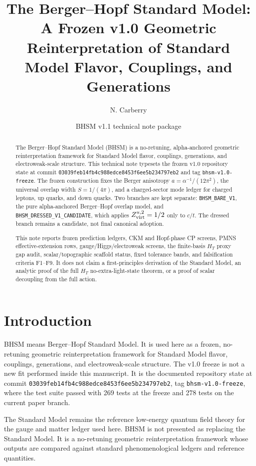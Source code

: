 \documentclass[11pt]{article}
\title{The Berger--Hopf Standard Model: A Frozen v1.0 Geometric Reinterpretation of Standard Model Flavor, Couplings, and Generations}
\author{N. Carberry}
\date{BHSM v1.1 technical note package}
\newcommand{\BHSM}{BHSM}
\newcommand{\Bare}{\texttt{BHSM\_BARE\_V1}}
\newcommand{\Dressed}{\texttt{BHSM\_DRESSED\_V1}\allowbreak\texttt{\_CANDIDATE}}
\newcommand{\HT}{\ensuremath{H_T}}
\newcommand{\CommitHash}{\texttt{03039feb14fb4c988edce}\allowbreak\texttt{8453f6ee5b234797eb2}}
\begin{document}
\maketitle

\begin{abstract}
The Berger--Hopf Standard Model (\BHSM) is a no-retuning, alpha-anchored
geometric reinterpretation framework for Standard Model flavor, couplings,
generations, and electroweak-scale structure. This technical note typesets the
frozen v1.0 repository state at commit
\CommitHash{} and tag
\texttt{bhsm-v1.0-freeze}. The frozen construction fixes the Berger anisotropy
$a=\alpha^{-1}/(12\pi^2)$, the universal overlap width $S=1/(4\pi)$, and a
charged-sector mode ledger for charged leptons, up quarks, and down quarks.
Two branches are kept separate: \Bare, the pure alpha-anchored Berger--Hopf
overlap model, and \Dressed, which applies $Z_{\rm virt}^{u,2}=1/2$ only to
$c/t$. The dressed branch remains a candidate, not final canonical adoption.

This note reports frozen prediction ledgers, CKM and Hopf-phase CP screens,
PMNS effective-extension rows, gauge/Higgs/electroweak screens, the finite-basis
\HT{} proxy gap audit, scalar/topographic scaffold status, fixed tolerance
bands, and falsification criteria F1--F9. It does not claim a first-principles
derivation of the Standard Model, an analytic proof of the full \HT{}
no-extra-light-state theorem, or a proof of scalar decoupling from the full
action.
\end{abstract}

\section{Introduction}

\BHSM{} means Berger--Hopf Standard Model. It is used here as a frozen,
no-retuning geometric reinterpretation framework for Standard Model flavor,
couplings, generations, and electroweak-scale structure. The v1.0 freeze is not
a new fit performed inside this manuscript. It is the documented repository
state at commit \CommitHash{}, tag
\texttt{bhsm-v1.0-freeze}, where the test suite passed with 269 tests at the
freeze and 278 tests on the current paper branch.

The Standard Model remains the reference low-energy quantum field theory for
the gauge and matter ledger used here. \BHSM{} is not presented as replacing the
Standard Model. It is a no-retuning geometric reinterpretation framework whose
outputs are compared against standard phenomenological ledgers and reference
quantities.
\end{document}
